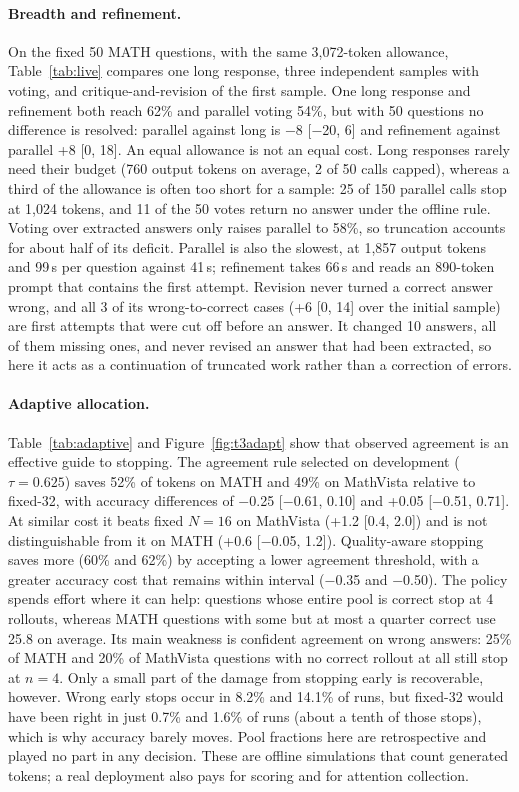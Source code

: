 \documentclass{article}
\begin{document}
\paragraph{Breadth and refinement.} On the fixed 50 MATH questions, with the same 3,072-token allowance, Table~\ref{tab:live} compares one long response, three independent samples with voting, and critique-and-revision \citep{madaan2023selfrefine} of the first sample. One long response and refinement both reach 62\% and parallel voting 54\%, but with 50 questions no difference is resolved: parallel against long is $-$8 [$-$20, 6] and refinement against parallel +8 [0, 18]. An equal allowance is not an equal cost. Long responses rarely need their budget (760 output tokens on average, 2 of 50 calls capped), whereas a third of the allowance is often too short for a sample: 25 of 150 parallel calls stop at 1,024 tokens, and 11 of the 50 votes return no answer under the offline rule. Voting over extracted answers only raises parallel to 58\%, so truncation accounts for about half of its deficit. Parallel is also the slowest, at 1,857 output tokens and 99\,s per question against 41\,s; refinement takes 66\,s and reads an 890-token prompt that contains the first attempt. Revision never turned a correct answer wrong, and all 3 of its wrong-to-correct cases (+6 [0, 14] over the initial sample) are first attempts that were cut off before an answer. It changed 10 answers, all of them missing ones, and never revised an answer that had been extracted, so here it acts as a continuation of truncated work rather than a correction of errors.

\paragraph{Adaptive allocation.} Table~\ref{tab:adaptive} and Figure~\ref{fig:t3adapt} show that observed agreement is an effective guide to stopping. The agreement rule selected on development ($\tau=0.625$) saves 52\% of tokens on MATH and 49\% on MathVista relative to fixed-32, with accuracy differences of $-$0.25 [$-$0.61, 0.10] and +0.05 [$-$0.51, 0.71]. At similar cost it beats fixed $N=16$ on MathVista (+1.2 [0.4, 2.0]) and is not distinguishable from it on MATH (+0.6 [$-$0.05, 1.2]). Quality-aware stopping saves more (60\% and 62\%) by accepting a lower agreement threshold, with a greater accuracy cost that remains within interval ($-$0.35 and $-$0.50). The policy spends effort where it can help: questions whose entire pool is correct stop at 4 rollouts, whereas MATH questions with some but at most a quarter correct use 25.8 on average. Its main weakness is confident agreement on wrong answers: 25\% of MATH and 20\% of MathVista questions with no correct rollout at all still stop at $n=4$. Only a small part of the damage from stopping early is recoverable, however. Wrong early stops occur in 8.2\% and 14.1\% of runs, but fixed-32 would have been right in just 0.7\% and 1.6\% of runs (about a tenth of those stops), which is why accuracy barely moves. Pool fractions here are retrospective and played no part in any decision. These are offline simulations that count generated tokens; a real deployment also pays for scoring and for attention collection.
\end{document}
